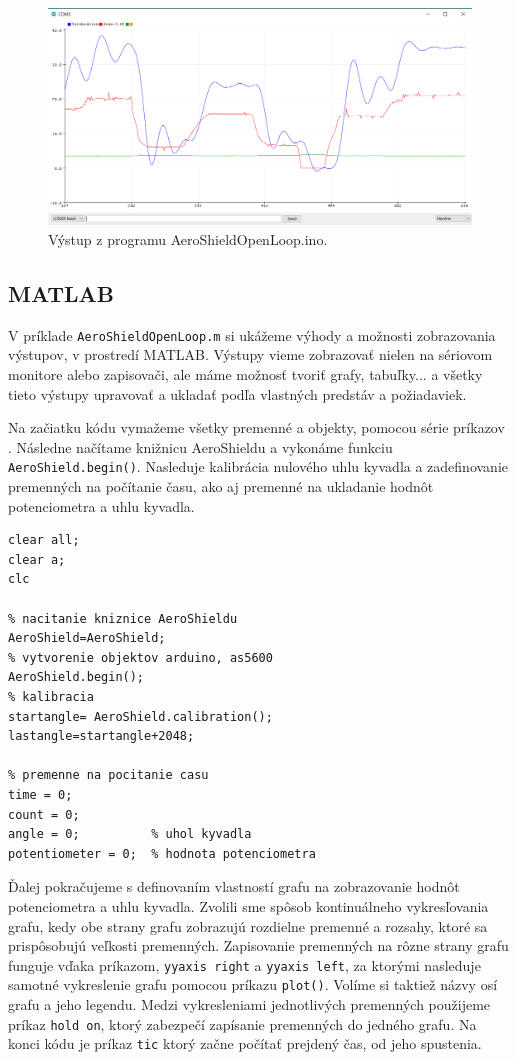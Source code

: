 \begin{figure}[!tbh]
	\centering
	\includegraphics[width=120mm]{obr/VystupOLIDE.png}
	\caption{Výstup z programu AeroShieldOpenLoop.ino.}\label{OBRAZOK 3.1}
\end{figure}

\subsection{MATLAB}

V príklade \verb|AeroShieldOpenLoop.m| si ukážeme výhody a možnosti zobrazovania výstupov, v prostredí MATLAB. Výstupy vieme zobrazovať nielen na sériovom monitore alebo zapisovači, ale máme možnosť tvoriť grafy, tabuľky... a všetky tieto výstupy upravovať a ukladať podľa vlastných predstáv a požiadaviek. 


Na začiatku kódu vymažeme všetky premenné a objekty, pomocou série príkazov . Následne načítame knižnicu AeroShieldu a vykonáme funkciu \verb|AeroShield.begin()|. Nasleduje kalibrácia nulového uhlu kyvadla a zadefinovanie premenných na počítanie času, ako aj premenné na ukladanie hodnôt potenciometra a uhlu kyvadla. 

\begin{lstlisting}[caption={AeroShield open loop inicializacia.},captionpos=b]
% vymazanie premennych a objektov 
clear all;
clear a;
clc 

% nacitanie kniznice AeroShieldu  
AeroShield=AeroShield;
% vytvorenie objektov arduino, as5600
AeroShield.begin();
% kalibracia
startangle= AeroShield.calibration(); 
lastangle=startangle+2048; 

% premenne na pocitanie casu
time = 0;
count = 0;
angle = 0;          % uhol kyvadla
potentiometer = 0;  % hodnota potenciometra
\end{lstlisting}

Ďalej pokračujeme s definovaním vlastností grafu na zobrazovanie hodnôt potenciometra a uhlu kyvadla. Zvolili sme spôsob kontinuálneho vykresľovania grafu, kedy obe strany grafu zobrazujú rozdielne premenné a rozsahy, ktoré sa prispôsobujú veľkosti premenných. Zapisovanie premenných na rôzne strany grafu funguje vďaka príkazom, \verb|yyaxis right| a \verb|yyaxis left|, za ktorými nasleduje samotné vykreslenie grafu pomocou príkazu \verb|plot()|. Volíme si taktiež názvy osí grafu a jeho legendu. Medzi vykresleniami jednotlivých premenných použijeme príkaz \verb|hold on|, ktorý zabezpečí zapísanie premenných do jedného grafu. Na konci kódu je príkaz \verb|tic| ktorý začne počítať prejdený čas, od jeho spustenia. 

